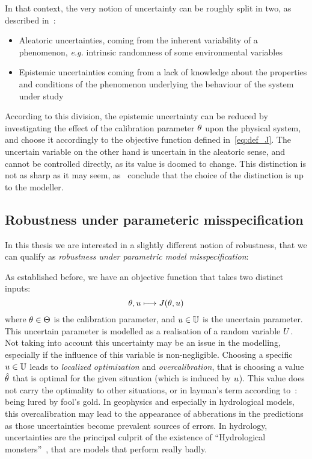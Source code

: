 \documentclass[../../Main_ManuscritThese.tex]{subfiles}
\begin{document}
In that context, the very notion of uncertainty can be roughly split in two, as described in~\cite{walker_defining_2003}:
\begin{itemize}
\item Aleatoric uncertainties, coming from the inherent variability of a phenomenon, \emph{e.g.} intrinsic randomness of some environmental variables
\item Epistemic uncertainties coming from a lack of knowledge about the properties and conditions of the phenomenon underlying the behaviour of the system under study
\end{itemize}
According to this division,  the epistemic uncertainty can be reduced by investigating the effect of the calibration parameter $\theta$ upon the physical system, and choose it accordingly to the objective function defined in~\cref{eq:def_J}.
The uncertain variable on the other hand is uncertain in the aleatoric sense, and cannot be controlled directly, as its value is doomed to change. This distinction is not as sharp as it may seem, as~\cite{kiureghian_aleatory_2009} conclude that the choice of the distinction is up to the modeller.



\subsection{Robustness under parameteric misspecification}
In this thesis we are interested in a slightly different notion of robustness, that we can qualify as \emph{robustness under parametric model misspecification}:

As established before, we have an objective function that takes two distinct inputs:
\begin{equation}
  \label{eq:def_J}
  \theta, u \longmapsto J(\theta,u)
\end{equation}
where $\theta\in \Theta$ is the calibration parameter, and $u \in \mathbb{U}$ is the uncertain parameter. This uncertain parameter is modelled as a realisation of a random variable $U$.
Not taking into account this uncertainty may be an issue in the modelling, especially if the influence of this variable is non-negligible.
Choosing a specific $u \in \mathbb{U}$ leads to \emph{localized optimization} \citep{huyse_free-form_2001} and \emph{overcalibration}, that is choosing a value $\hat{\theta}$ that is optimal for the given situation (which is induced by $u$). This value does not carry the optimality to other situations, or in layman's term according to~\cite{andreassian_all_2012}: being lured by fool's gold.
In geophysics and especially in hydrological models, this overcalibration may lead to the appearance of abberations in the predictions as those uncertainties become prevalent sources of errors. In hydrology, uncertainties are the principal culprit of the existence of  ``Hydrological monsters''~\citep{kuczera_there_2010}, that are models that perform really badly.
\end{document}
